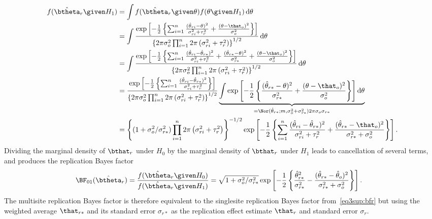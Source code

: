 \begin{subappendices}
\begin{align*}
        f(\hat{\btheta}_{r} \given H_{1})
        &= \int f(\hat{\btheta}_{r} \given \theta) f(\theta \given H_{1})
                        \, \text{d}\theta \\
              &= \int \frac{\exp\left[-\frac{1}{2} \left\{\sum_{i=1}^{n} \frac{(\hat{\theta}_{ri} - \theta)^{2}}{\sigma^{2}_{ri} + \tau^{2}_{r}} +
                  \frac{(\theta - \that_{o})^{2}}{\sigma^{2}_{o}}\right\} \right]}{
                                    \left\{2\pi \sigma^{2}_{o} \prod_{i = 1}^{n} 2\pi \left(\sigma^{2}_{ri} + \tau^{2}_{r}\right)\right\}^{1/2}}
    \, \text{d}\theta \\
  &= \int \frac{
    \exp\left[-\frac{1}{2} \left\{\sum_{i=1}^{n} \frac{(\hat{\theta}_{ri} - \hat{\theta}_{r*})^{2}}{\sigma^{2}_{ri} + \tau^{2}_{r}} +  \frac{(\hat{\theta}_{r*} - \theta)^{2}}{\sigma^{2}_{r*}} +
    \frac{(\theta - \that_{o})^{2}}{\sigma^{2}_{o}}\right\} \right]}{
    \left\{2\pi \sigma^{2}_{o} \prod_{i = 1}^{n} 2\pi \left(\sigma^{2}_{ri} + \tau^{2}_{r}\right)\right\}^{1/2}}
    \, \text{d}\theta \\
  &= \frac{\exp\left[-\frac{1}{2} \left\{\sum_{i=1}^{n} \frac{(\hat{\theta}_{ri} - \hat{\theta}_{r*})^{2}}{\sigma^{2}_{ri} + \tau^{2}_{r}}\right\} \right]}{\left\{2\pi \sigma^{2}_{o} \prod_{i = 1}^{n} 2\pi \left(\sigma^{2}_{ri} + \tau^{2}_{r}\right)\right\}^{1/2}}
    \underbrace{\int \exp\left[-\frac{1}{2} \left\{\frac{(\hat{\theta}_{r*} - \theta)^{2}}{\sigma^{2}_{r*}} +
    \frac{(\theta - \that_{o})^{2}}{\sigma^{2}_{o}}\right\} \right] \text{d}\theta}_{= \Nor(\hat{\theta}_{r*}; m, \sigma^{2}_{o} + \sigma^{2}_{r*}) 2\pi \sigma_{o} \sigma_{r*}} \\
  &= \left\{(1 + \sigma^{2}_{o}/\sigma^{2}_{r*}) \prod_{i = 1}^{n} 2\pi \left(\sigma^{2}_{ri} + \tau^{2}_{r}\right)\right\}^{-1/2} \exp\left[-\frac{1}{2}\left\{
    \sum_{i=1}^{n} \frac{(\hat{\theta}_{ri} - \hat{\theta}_{r*})^{2}}{\sigma^{2}_{ri} + \tau^{2}_{r}} + \frac{(\hat{\theta}_{r*} - \that_{o})^{2}}{\sigma^{2}_{r*} + \sigma^{2}_{o}}\right\}\right].
\end{align*}
Dividing the marginal density of $\bthat_{r}$ under $H_{0}$ by the marginal
density of $\bthat_{r}$ under $H_{1}$ leads to cancellation of several terms, and
produces the replication Bayes factor
\begin{align*}
  \BF_{01}(\hat{\btheta}_{r})
  &= \frac{f(\hat{\btheta}_{r} \given H_{0})}{f(\hat{\btheta}_{r} \given H_{1})}
    = \sqrt{1 + \sigma^{2}_{o}/\sigma^{2}_{r*}}  \exp\left[-\frac{1}{2}\left\{
    \frac{\hat{\theta}_{r*}^{2}}{\sigma^{2}_{r*}} -
    \frac{(\hat{\theta}_{r*} - \hat{\theta}_{o})^{2}}{\sigma^{2}_{r*} + \sigma^{2}_{o}}\right\}\right].
\end{align*}
The multisite replication Bayes factor is therefore equivalent to the singlesite
replication Bayes factor from~\eqref{eq3sup:bfr} but using the weighted average
$\that_{r*}$ and its standard error $\sigma_{r*}$ as the replication effect
estimate $\that_{r}$ and standard error $\sigma_{r}$.


\end{subappendices}
